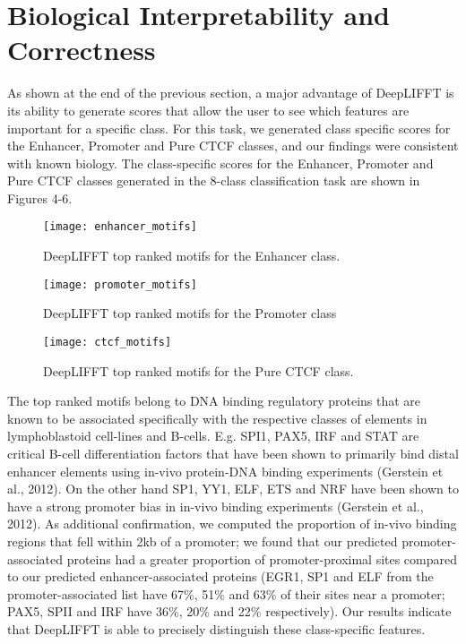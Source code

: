 \documentclass{article}
\begin{document}
\section{Biological Interpretability and Correctness}
As shown at the end of the previous section, a major advantage of DeepLIFFT is its ability to generate scores that allow the user to see which features are important for a specific class. For this task, we generated class specific scores for the Enhancer, Promoter and Pure CTCF classes, and our findings were consistent with known biology. The class-specific scores for the Enhancer, Promoter and Pure CTCF classes generated in the 8-class classification task are shown in Figures 4-6.
\begin{figure}[!htb]
\begin{center}
\centerline{\texttt{[image: enhancer\_motifs]}}
\caption{DeepLIFFT top ranked motifs for the Enhancer class.}
\label{rfChart}
\end{center}
\end{figure} 
\begin{figure}[!htb]
\begin{center}
\centerline{\texttt{[image: promoter\_motifs]}}
\caption{DeepLIFFT top ranked motifs for the Promoter class}
\label{rfChart}
\end{center}
\end{figure} 
\begin{figure}[!htb]
\begin{center}
\centerline{\texttt{[image: ctcf\_motifs]}}
\caption{DeepLIFFT top ranked motifs for the Pure CTCF class.}
\label{rfChart}
\end{center}
\end{figure} 

The top ranked motifs belong to DNA binding regulatory proteins that are known to be associated specifically with the respective classes of elements in lymphoblastoid cell-lines and B-cells. E.g. SPI1, PAX5, IRF and STAT are critical B-cell differentiation factors that have been shown to primarily bind distal enhancer elements using in-vivo protein-DNA binding experiments (Gerstein et al., 2012). On the other hand SP1, YY1, ELF, ETS and NRF have been shown to have a strong promoter bias in in-vivo binding experiments (Gerstein et al., 2012). As additional confirmation, we computed the proportion of in-vivo binding regions that fell within 2kb of a promoter; we found that our predicted promoter-associated proteins had a greater proportion of promoter-proximal sites compared to our predicted enhancer-associated proteins (EGR1, SP1 and ELF from the promoter-associated list have 67\%, 51\% and 63\% of their sites near a promoter; PAX5, SPII and IRF have 36\%, 20\% and 22\% respectively). Our results indicate that DeepLIFFT is able to precisely distinguish these class-specific features.
\end{document}
